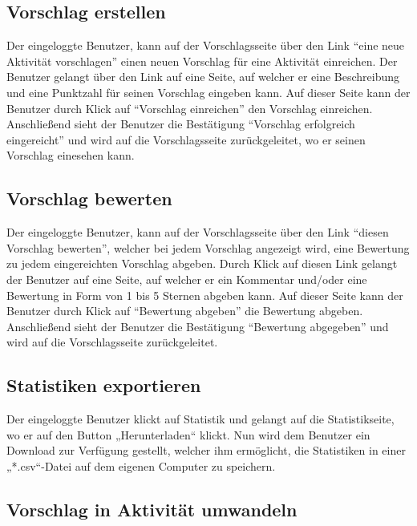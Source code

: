 \subsection{Vorschlag erstellen}
Der eingeloggte Benutzer, kann auf der Vorschlagsseite über den Link
``eine neue Aktivität vorschlagen'' einen neuen Vorschlag für eine
Aktivität einreichen. Der Benutzer gelangt über den Link auf eine
Seite, auf welcher er eine Beschreibung und eine Punktzahl für seinen Vorschlag
 eingeben kann. Auf dieser Seite kann der Benutzer durch Klick auf
 ``Vorschlag einreichen'' den Vorschlag einreichen. Anschließend sieht
 der Benutzer die Bestätigung ``Vorschlag erfolgreich eingereicht''
 und wird auf die Vorschlagsseite zurückgeleitet, wo er seinen
 Vorschlag einesehen kann.\\
 
\subsection{Vorschlag bewerten}
Der eingeloggte Benutzer, kann auf der Vorschlagsseite über den Link
``diesen Vorschlag bewerten'', welcher bei jedem Vorschlag angezeigt
wird, eine Bewertung zu jedem eingereichten Vorschlag abgeben. Durch
Klick auf diesen Link gelangt der Benutzer auf eine Seite, auf welcher
er ein Kommentar und/oder eine Bewertung in Form von 1 bis 5 Sternen
abgeben kann.  Auf dieser Seite kann der Benutzer durch Klick auf
 ``Bewertung abgeben'' die Bewertung abgeben. Anschließend sieht
 der Benutzer die Bestätigung ``Bewertung abgegeben'' und wird auf die Vorschlagsseite zurückgeleitet.\\
 

\subsection{Statistiken exportieren}
Der eingeloggte Benutzer klickt auf Statistik und gelangt auf die Statistikseite, wo er auf den Button „Herunterladen“ klickt. Nun wird dem Benutzer ein Download zur Verfügung gestellt, welcher ihm ermöglicht, die Statistiken in einer „*.csv“-Datei auf dem eigenen Computer zu speichern.\\
\subsection{Vorschlag in Aktivität umwandeln}
